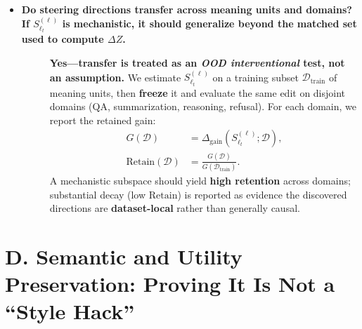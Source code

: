 \begin{itemize}[leftmargin=1.5em]
\item[\ding{93}] \textbf{Do steering directions transfer across meaning units and domains? If $S^{(\ell)}_{\ell_t}$ is mechanistic, it should generalize beyond the matched set used to compute $\Delta Z$.}
\begin{description}
\item[] \textbf{Yes—transfer is treated as an \emph{OOD interventional} test, not an assumption.}
We estimate $S^{(\ell)}_{\ell_t}$ on a training subset $\mathcal{D}_{\text{train}}$ of meaning units, then \textbf{freeze} it and evaluate the same edit on disjoint domains (QA, summarization, reasoning, refusal). For each domain, we report the retained gain:
\[
\begin{aligned}
G(\mathcal{D}) &= \Delta_{\mathrm{gain}}(S^{(\ell)}_{\ell_t};\mathcal{D}),\\
\mathrm{Retain}(\mathcal{D}) &= \frac{G(\mathcal{D})}{G(\mathcal{D}_{\text{train}})}.
\end{aligned}
\]
A mechanistic subspace should yield \textbf{high retention} across domains; substantial decay (low $\mathrm{Retain}$) is reported as evidence the discovered directions are \textbf{dataset-local} rather than generally causal.
\end{description}








\end{itemize}

\section*{D. Semantic and Utility Preservation: Proving It Is Not a “Style Hack”}

